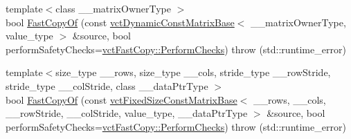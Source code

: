 {\bf }\par
\begin{DoxyCompactItemize}
\item 
{\footnotesize template$<$class \-\_\-\-\_\-matrix\-Owner\-Type $>$ }\\bool \hyperlink{classvct_dynamic_matrix_base_ad8fc2fec875cccff85761db606bd723b}{Fast\-Copy\-Of} (const \hyperlink{classvct_dynamic_const_matrix_base}{vct\-Dynamic\-Const\-Matrix\-Base}$<$ \-\_\-\-\_\-matrix\-Owner\-Type, value\-\_\-type $>$ \&source, bool perform\-Safety\-Checks=\hyperlink{classvct_fast_copy_af2981ae09904d1a4dd9b2d19c86c6cd9}{vct\-Fast\-Copy\-::\-Perform\-Checks})  throw (std\-::runtime\-\_\-error)
\item 
{\footnotesize template$<$size\-\_\-type \-\_\-\-\_\-rows, size\-\_\-type \-\_\-\-\_\-cols, stride\-\_\-type \-\_\-\-\_\-row\-Stride, stride\-\_\-type \-\_\-\-\_\-col\-Stride, class \-\_\-\-\_\-data\-Ptr\-Type $>$ }\\bool \hyperlink{classvct_dynamic_matrix_base_af65803a76f8bc775f088417e3eb83848}{Fast\-Copy\-Of} (const \hyperlink{classvct_fixed_size_const_matrix_base}{vct\-Fixed\-Size\-Const\-Matrix\-Base}$<$ \-\_\-\-\_\-rows, \-\_\-\-\_\-cols, \-\_\-\-\_\-row\-Stride, \-\_\-\-\_\-col\-Stride, value\-\_\-type, \-\_\-\-\_\-data\-Ptr\-Type $>$ \&source, bool perform\-Safety\-Checks=\hyperlink{classvct_fast_copy_af2981ae09904d1a4dd9b2d19c86c6cd9}{vct\-Fast\-Copy\-::\-Perform\-Checks})  throw (std\-::runtime\-\_\-error)
\end{DoxyCompactItemize}

